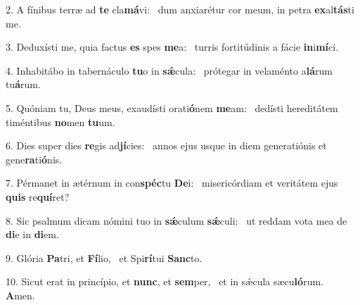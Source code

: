 2. A fínibus terræ ad \textbf{te} cla\textbf{má}vi: \ast\  dum anxiarétur cor meum, in petra \textbf{ex}al\textbf{tás}ti me.\

3. Deduxísti me, quia factus \textbf{es} spes \textbf{me}a: \ast\  turris fortitúdinis a fácie \textbf{in}i\textbf{mí}ci.\

4. Inhabitábo in tabernáculo \textbf{tu}o in \textbf{sǽ}cula: \ast\  prótegar in velaménto a\textbf{lá}rum tu\textbf{á}rum.\

5. Quóniam tu, Deus meus, exaudísti orati\textbf{ó}nem \textbf{me}am: \ast\  dedísti hereditátem timéntibus \textbf{no}men \textbf{tu}um.\

6. Dies super dies \textbf{re}gis ad\textbf{jí}cies: \ast\  annos ejus usque in diem generatiónis et gene\textbf{ra}ti\textbf{ó}nis.\

7. Pérmanet in ætérnum in con\textbf{spéc}tu \textbf{De}i: \ast\  misericórdiam et veritátem ejus \textbf{quis} re\textbf{quí}ret?\

8. Sic psalmum dicam nómini tuo in \textbf{sǽ}culum \textbf{sǽ}culi: \ast\  ut reddam vota mea de \textbf{di}e in \textbf{di}em.\

9. Glória \textbf{Pa}tri, et \textbf{Fí}lio, \ast\  et Spi\textbf{rí}tui \textbf{Sanc}to.\

10. Sicut erat in princípio, et \textbf{nunc}, et \textbf{sem}per, \ast\  et in sǽcula sæcu\textbf{ló}rum. \textbf{A}men.\

